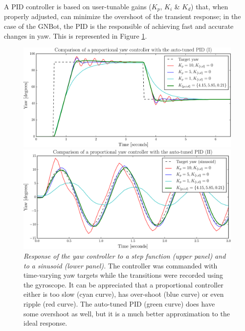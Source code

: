 \documentclass[12pt,twoside]{report}
\begin{document}
A PID controller is based on user-tunable gains ($K_p$, $K_i$ \& $K_d$) that, when properly adjusted, can minimize the overshoot of the transient response; in the case of the GNBot, the PID is the responsible of achieving fast and accurate changes in yaw. This is represented in Figure \ref{fig:P_controller_vs_autotuned_PID}.


\begin{figure}[hbtp]
\centerline{\includegraphics[width=0.97\linewidth]{P_controller_vs_autotuned_PID}}
\vspace{-3mm}
\centerline{\includegraphics[width=0.99\linewidth]{P_controller_vs_autotuned_PID_sinusoid}}
\caption[Response of the yaw controller to a step function and to a sinusoid]{\emph{Response of the yaw controller to a step function (upper panel) and to a sinusoid (lower panel).}
The controller was commanded with time-varying yaw targets while the transitions were recorded using the gyroscope.
It can be appreciated that a proportional controller either is too slow (cyan curve), has over-shoot (blue curve) or even ripple (red curve).
The auto-tuned PID (green curve) does have some overshoot as well, but it is a much better approximation to the ideal response.
}
\label{fig:P_controller_vs_autotuned_PID}
\end{figure}
\end{document}
